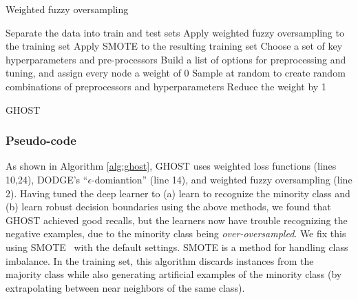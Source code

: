 \documentclass[10pt,compsoc,twocolumn]{IEEEtran}
\begin{document}
\begin{algorithm}[h]
\footnotesize
    \SetAlgoLined
    \caption{Weighted fuzzy oversampling}
    \label{alg:wfo}
\end{algorithm}



\begin{algorithm}[!h]
\footnotesize
    \SetAlgoLined
    Separate the data into train and test sets\;
    Apply weighted fuzzy oversampling to the training set\;
    Apply SMOTE to the resulting training set\;
    Choose a set of key hyperparameters and pre-processors\;
    Build a list of options for preprocessing and tuning, and assign every node a weight of 0\;
    Sample at random to create random combinations of preprocessors and hyperparameters\;
     {
        Reduce the weight by 1\;
    }
    \KwRet{$\theta^*$}
    \caption{GHOST}
    \label{alg:ghost}
\end{algorithm}


\subsubsection{Pseudo-code}
\label{sec:pseudocode}
As shown in  Algorithm \ref{alg:ghost}, 
GHOST uses weighted loss functions (lines 10,24),
 DODGE's    ``$\epsilon$-domiantion'' (line 14), and
   weighted fuzzy oversampling (line 2).
    Having tuned the deep learner to (a) learn to recognize the minority class and (b) learn robust decision boundaries using the above methods,
    we found that
    GHOST achieved good recalls, but the learners now have trouble recognizing the negative examples, due to the minority class being \textit{over-oversampled}. We fix this using SMOTE~\cite{Chawla02} with the default settings.
   SMOTE is a method for handling class
    imbalance. In the training set, this algorithm discards instances
    from the majority class while also generating
    artificial examples of the minority class (by extrapolating between near neighbors of the same class).
\end{document}
